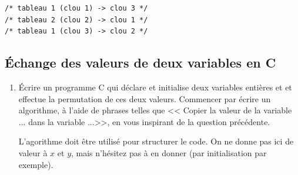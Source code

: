 \begin{correction}
\begin{verbatim}
/* tableau 1 (clou 1) -> clou 3 */
/* tableau 2 (clou 2) -> clou 1 */
/* tableau 1 (clou 3) -> clou 2 */
\end{verbatim}
\end{correction}

\subsection{Échange des valeurs de deux variables en C}

\begin{enumerate}
\item 
  Écrire un programme C qui déclare et initialise deux variables
  entières  et  et effectue la permutation de ces deux
  valeurs. Commencer par écrire un algorithme, à l'aide de phrases telles que << Copier la valeur de la variable ... dans la variable ...>>, en vous inspirant de la question précédente.
\begin{correction}
L'agorithme doit être utilisé pour structurer le code. On ne donne pas ici de valeur à $x$ et $y$, mais n'hésitez pas à en donner (par initialisation par exemple). 

{\small
{}
}
\end{correction}


\end{enumerate}
